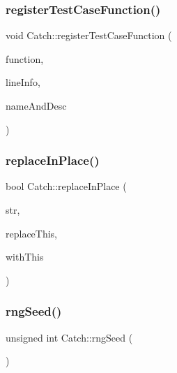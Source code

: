 \mbox{\label{namespace_catch_a220159aeff47f9c5231e893f2abbc643}} 
\subsubsection{\texorpdfstring{register\+Test\+Case\+Function()}{registerTestCaseFunction()}}
{\footnotesize\ttfamily void Catch\+::register\+Test\+Case\+Function (\begin{DoxyParamCaption}\item[{\mbox{\hyperlink{namespace_catch_a26414f52d0835939fae52aadd27e6257}{Test\+Function}}}]{function,  }\item[{\mbox{\hyperlink{struct_catch_1_1_source_line_info}{Source\+Line\+Info}} const \&}]{line\+Info,  }\item[{\mbox{\hyperlink{struct_catch_1_1_name_and_desc}{Name\+And\+Desc}} const \&}]{name\+And\+Desc }\end{DoxyParamCaption})}

\mbox{\label{namespace_catch_afe4e6770da547e43e9e4eeaa05f946ea}} 
\subsubsection{\texorpdfstring{replace\+In\+Place()}{replaceInPlace()}}
{\footnotesize\ttfamily bool Catch\+::replace\+In\+Place (\begin{DoxyParamCaption}\item[{std\+::string \&}]{str,  }\item[{std\+::string const \&}]{replace\+This,  }\item[{std\+::string const \&}]{with\+This }\end{DoxyParamCaption})}

\mbox{\label{namespace_catch_acf5ea05e942d2d7fe79111e12754ed76}} 
\subsubsection{\texorpdfstring{rng\+Seed()}{rngSeed()}}
{\footnotesize\ttfamily unsigned int Catch\+::rng\+Seed (\begin{DoxyParamCaption}{ }\end{DoxyParamCaption})}

